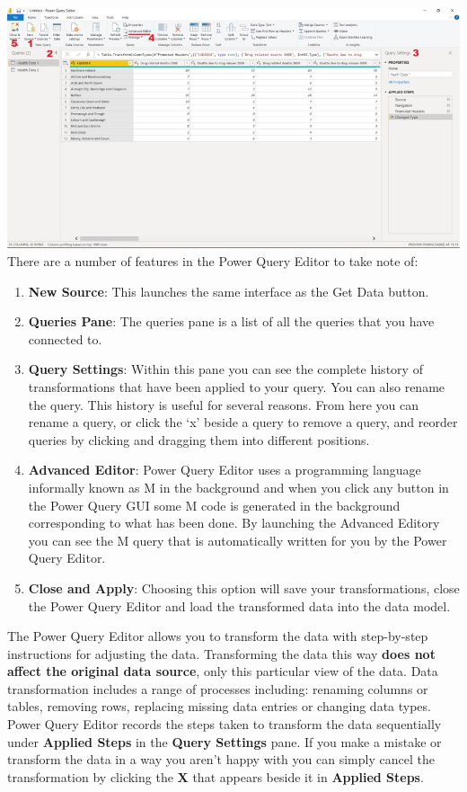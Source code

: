 \documentclass[
]{book}
\begin{document}
\includegraphics{bi3.jpg}
There are a number of features in the Power Query Editor to take note of:

\begin{enumerate}
\def\labelenumi{\arabic{enumi}.}
\item
  \textbf{New Source}: This launches the same interface as the Get Data button.
\item
  \textbf{Queries Pane}: The queries pane is a list of all the queries that you have connected to.
\item
  \textbf{Query Settings}: Within this pane you can see the complete history of transformations that have been applied to your query. You can also rename the query. This history is useful for several reasons. From here you can rename a query, or click the `x' beside a query to remove a query, and reorder queries by clicking and dragging them into different positions.
\item
  \textbf{Advanced Editor}: Power Query Editor uses a programming language informally known as M in the background and when you click any button in the Power Query GUI some M code is generated in the background corresponding to what has been done. By launching the Advanced Editory you can see the M query that is automatically written for you by the Power Query Editor.
\item
  \textbf{Close and Apply}: Choosing this option will save your transformations, close the Power Query Editor and load the transformed data into the data model.
\end{enumerate}

The Power Query Editor allows you to transform the data with step-by-step instructions for adjusting the data. Transforming the data this way \textbf{does not affect the original data source}, only this particular view of the data. Data transformation includes a range of processes including: renaming columns or tables, removing rows, replacing missing data entries or changing data types. Power Query Editor records the steps taken to transform the data sequentially under \textbf{Applied Steps} in the \textbf{Query Settings} pane. If you make a mistake or transform the data in a way you aren't happy with you can simply cancel the transformation by clicking the \textbf{X} that appears beside it in \textbf{Applied Steps}.
\end{document}
